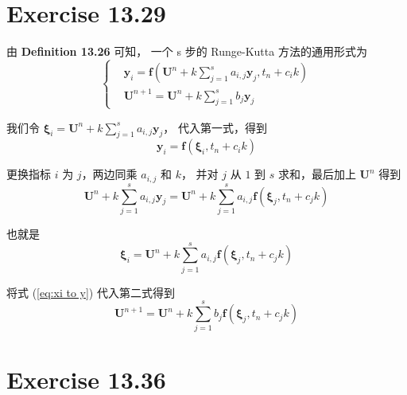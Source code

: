 \documentclass[a4paper]{article}
\begin{document}
\section*{Exercise 13.29}

\par 由 \textbf{Definition 13.26} 可知，
一个 s 步的 Runge-Kutta 方法的通用形式为
\begin{equation}
    \left\{
        \begin{aligned}
            &\mathbf{y}_i = \mathbf{f}\left(
                \mathbf{U}^n + k \sum_{j=1}^{s} a_{i,j} \mathbf{y}_j, t_n + c_i k
            \right)\\
            &\mathbf{U}^{n+1} = \mathbf{U}^n + k \sum_{j=1}^{s} b_j \mathbf{y}_j
        \end{aligned}
    \right.
\end{equation}
\par 我们令
$\bm{\xi}_i=\mathbf{U}^n + k \sum_{j=1}^{s} a_{i,j} \mathbf{y}_j$，
代入第一式，得到
\begin{equation}
    \label{eq:xi to y}
    \mathbf{y}_i = \mathbf{f}(\bm{\xi}_i, t_n + c_i k)
\end{equation}
\par 更换指标 $i$ 为 $j$，两边同乘 $a_{i,j}$ 和 $k$，
并对 $j$ 从 $1$ 到 $s$ 求和，最后加上 $\mathbf{U}^n$ 得到
\begin{equation}
    \mathbf{U}^n + k \sum_{j=1}^{s} a_{i,j} \mathbf{y}_j = \mathbf{U}^n + k \sum_{j=1}^{s} a_{i,j} \mathbf{f}(\bm{\xi}_j, t_n + c_j k)
\end{equation}
\par 也就是
\begin{equation}
    \bm{\xi}_i = \mathbf{U}^n + k \sum_{j=1}^{s} a_{i,j} \mathbf{f}(\bm{\xi}_j, t_n + c_j k)
\end{equation}
\par 将式 (\ref{eq:xi to y}) 代入第二式得到
\begin{equation}
    \mathbf{U}^{n+1} = \mathbf{U}^n + k \sum_{j=1}^{s} b_j \mathbf{f}(\bm{\xi}_j, t_n + c_j k)
\end{equation}

\section*{Exercise 13.36}
\end{document}
